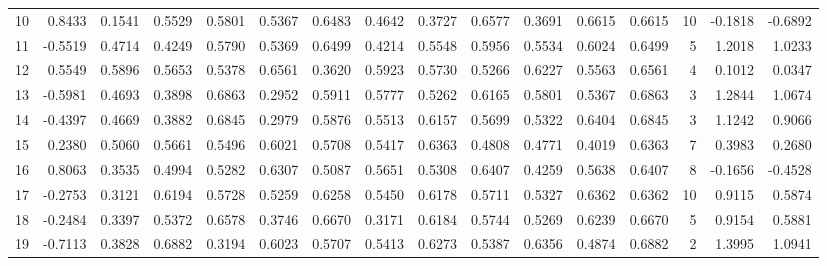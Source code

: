 \begin{tabular}{lrrrrrrrrrrrrrrr}
10 &      0.8433 &  0.1541 &  0.5529 &  0.5801 &  0.5367 &  0.6483 &  0.4642 &  0.3727 &  0.6577 &  0.3691 &   0.6615 &     0.6615 &     10 &                   -0.1818 &                    -0.6892 \\
11 &     -0.5519 &  0.4714 &  0.4249 &  0.5790 &  0.5369 &  0.6499 &  0.4214 &  0.5548 &  0.5956 &  0.5534 &   0.6024 &     0.6499 &      5 &                    1.2018 &                     1.0233 \\
12 &      0.5549 &  0.5896 &  0.5653 &  0.5378 &  0.6561 &  0.3620 &  0.5923 &  0.5730 &  0.5266 &  0.6227 &   0.5563 &     0.6561 &      4 &                    0.1012 &                     0.0347 \\
13 &     -0.5981 &  0.4693 &  0.3898 &  0.6863 &  0.2952 &  0.5911 &  0.5777 &  0.5262 &  0.6165 &  0.5801 &   0.5367 &     0.6863 &      3 &                    1.2844 &                     1.0674 \\
14 &     -0.4397 &  0.4669 &  0.3882 &  0.6845 &  0.2979 &  0.5876 &  0.5513 &  0.6157 &  0.5699 &  0.5322 &   0.6404 &     0.6845 &      3 &                    1.1242 &                     0.9066 \\
15 &      0.2380 &  0.5060 &  0.5661 &  0.5496 &  0.6021 &  0.5708 &  0.5417 &  0.6363 &  0.4808 &  0.4771 &   0.4019 &     0.6363 &      7 &                    0.3983 &                     0.2680 \\
16 &      0.8063 &  0.3535 &  0.4994 &  0.5282 &  0.6307 &  0.5087 &  0.5651 &  0.5308 &  0.6407 &  0.4259 &   0.5638 &     0.6407 &      8 &                   -0.1656 &                    -0.4528 \\
17 &     -0.2753 &  0.3121 &  0.6194 &  0.5728 &  0.5259 &  0.6258 &  0.5450 &  0.6178 &  0.5711 &  0.5327 &   0.6362 &     0.6362 &     10 &                    0.9115 &                     0.5874 \\
18 &     -0.2484 &  0.3397 &  0.5372 &  0.6578 &  0.3746 &  0.6670 &  0.3171 &  0.6184 &  0.5744 &  0.5269 &   0.6239 &     0.6670 &      5 &                    0.9154 &                     0.5881 \\
19 &     -0.7113 &  0.3828 &  0.6882 &  0.3194 &  0.6023 &  0.5707 &  0.5413 &  0.6273 &  0.5387 &  0.6356 &   0.4874 &     0.6882 &      2 &                    1.3995 &                     1.0941 \\
\bottomrule
\end{tabular}
